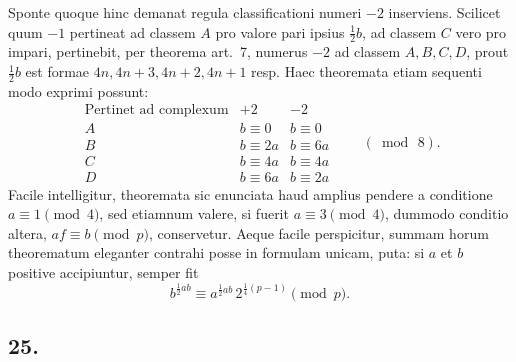 \documentclass[12pt]{article}
\begin{document}
Sponte quoque hinc demanat regula classificationi numeri $-2$ inserviens. Scilicet quum $-1$ pertineat ad classem $A$ pro valore pari ipsius $\frac12 b$, ad classem $C$ vero pro impari, pertinebit, per theorema art.~7, numerus $-2$ ad classem $A,B,C,D$, prout $\frac12 b$ est formae $4n,4n+3,4n+2,4n+1$ resp. Haec theoremata etiam sequenti modo exprimi possunt:
\[
\begin{array}{c|cc}
\text{Pertinet ad complexum} & +2 & -2\\
\hline
A & b\equiv 0 & b\equiv 0\\
B & b\equiv 2a & b\equiv 6a\\
C & b\equiv 4a & b\equiv 4a\\
D & b\equiv 6a & b\equiv 2a
\end{array}
\qquad(\bmod\,8).
\]
Facile intelligitur, theoremata sic enunciata haud amplius pendere a conditione $a\equiv 1\pmod 4$, sed etiamnum valere, si fuerit $a\equiv 3\pmod 4$, dummodo conditio altera, $af\equiv b\pmod p$, conservetur. Aeque facile perspicitur, summam horum theorematum eleganter contrahi posse in formulam unicam, puta: si $a$ et $b$ positive accipiuntur, semper fit
\[
b^{\frac12 ab}\equiv a^{\frac12 ab}\,2^{\frac14(p-1)}\pmod p.
\]

\subsection*{25.}
\end{document}
